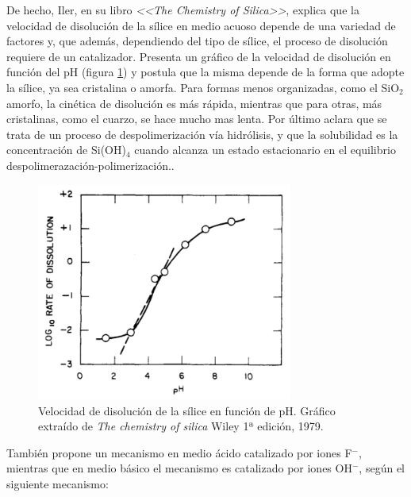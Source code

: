 	De hecho, Iler, en su libro \textit{<<The Chemistry of Silica>>}, explica que la velocidad de disolución de la sílice en medio acuoso depende de una variedad de factores y, que además, dependiendo del tipo de sílice, el proceso de disolución requiere de un catalizador. Presenta un gráfico de la velocidad de disolución en función del pH (figura \ref{fig:disolucion_ph}) y postula que la misma depende de la forma que adopte la sílice, ya sea cristalina o amorfa. Para formas menos organizadas, como el SiO$_2$ amorfo, la cinética de disolución es más rápida, mientras que para otras, más cristalinas, como el cuarzo, se hace mucho mas lenta. Por último aclara que se trata de un proceso de despolimerización vía hidrólisis, y que la solubilidad es la concentración de Si(OH)$_4$ cuando alcanza un estado estacionario en el equilibrio despolimerazación-polimerización.\cite{iler1979,blesa1994}. 

			\begin{figure}[th!]
			    \begin{center}
			    \includegraphics[width=0.75\textwidth]{Graficos/disolucion_ph.jpg}
	       		\caption[Velocidad de disolución sílice en función del pH]{Velocidad de disolución de la sílice en función de pH. Gráfico extraído de \textit{The chemistry of silica} Wiley 1ª edición, 1979.\cite{iler1979}}
	         	\label{fig:disolucion_ph}
	     		\end{center}
	     		\end{figure}
	
	\pagebreak También propone un mecanismo en medio ácido catalizado por iones F$^-$, mientras que en medio básico el mecanismo es catalizado por iones OH$^-$, según el siguiente mecanismo:
		
